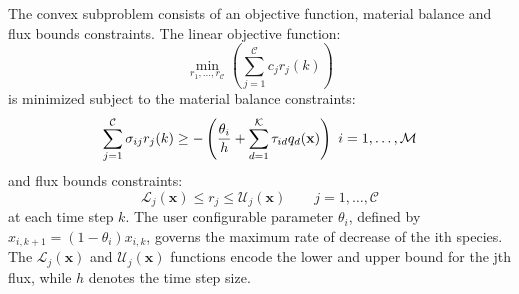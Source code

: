 \documentclass[10pt,twocolumn,twoside,final]{IEEEtran}
\begin{document}
The convex subproblem consists of an objective function, material balance and flux bounds constraints.
The linear objective function:
\begin{equation}
  \min_{r_{1},\hdots,r_{\mathcal{C}}} \left(\sum_{j=1}^{\mathcal{C}}c_{j}r_{j}(k)\right)
\end{equation}
is minimized subject to the material balance constraints:
\begin{equation}\nonumber
  \sum_{j=1}^{\mathcal{C}} \sigma_{ij}r_{j}(k) \geq - \left(\frac{\theta_{i}}{h} + \sum_{d=1}^{\mathcal{K}}\tau_{id}q_{d}(\mathbf{x})\right)~i=1,\hdots,\mathcal{M}\\
\end{equation}and flux bounds constraints:
\begin{equation}\nonumber
  \mathcal{L}_{j}(\mathbf{x})\leq r_{j} \leq \mathcal{U}_{j}(\mathbf{x})\qquad j=1,\hdots,\mathcal{C}
\end{equation}at each time step $k$.
The user configurable parameter $\theta_{i}$, defined by $x_{i,k+1}=\left(1-\theta_{i}\right)x_{i,k}$, governs the maximum rate of decrease of the ith species.
The $\mathcal{L}_{j}(\mathbf{x})$ and $\mathcal{U}_{j}(\mathbf{x})$ functions encode
the lower and upper bound for the jth flux, while $h$ denotes the time step size.




\end{document}
